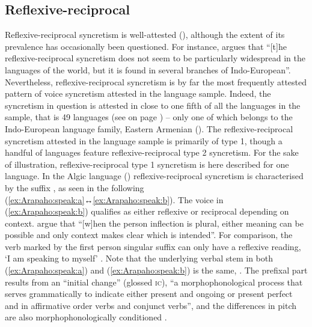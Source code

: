 \subsection{Reflexive-reciprocal} \label{sec:simple-syncretism:refl-recp}
Reflexive-reciprocal syncretism is well-attested (\citealt{geniusiene:1987, knjazev:1998, nedjalkov:2007a}), although the extent of its prevalence has occasionally been questioned. For instance, \cite[66]{creissels:2016} argues that “[t]he re\-flex\-ive-reciprocal syncretism does not seem to be particularly widespread in the languages of the world, but it is found in several branches of Indo-European”. Nevertheless, re\-flex\-ive-reciprocal syncretism is by far the most frequently attested pattern of voice syncretism attested in the language sample. Indeed, the syncretism in question is attested in close to one fifth of all the languages in the sample, that is 49 languages (see  on page \pageref{tab:ch6:voice-syncretism-simplex}) -- only one of which belongs to the Indo-European language family, Eastern Armenian (). The reflexive-reciprocal syncretism attested in the language sample is primarily of type 1, though a handful of languages feature reflexive-reciprocal type 2 syncretism. For the sake of illustration, reflexive-reciprocal type 1 syncretism is here described for one language. In the Algic language  () reflexive-reciprocal syncretism is characterised by the suffix , as seen in the following  (\ref{ex:Arapaho:speak:a}↔\ref{ex:Arapaho:speak:b}). The voice in (\ref{ex:Arapaho:speak:b}) qualifies as either reflexive or reciprocal depending on context. \cite[140]{cowell:moss:2008} argue that “[w]hen the person inflection is plural, either meaning can be possible and only context makes clear which is intended”. For comparison, the verb  marked by the first person singular suffix  can only have a reflexive reading, ‘I am speaking to myself’ \citep[139]{cowell:moss:2008}. Note that the underlying verbal stem in both (\ref{ex:Arapaho:speak:a}) and (\ref{ex:Arapaho:speak:b}) is the same, . The prefixal part  results from an “initial change” (glossed \textsc{ic}), “a morphophonological process that serves grammatically to indicate either present  and ongoing  or present perfect  and  in affirmative order verbs and conjunct  verbs”, and the differences in pitch are also morphophonologically conditioned \citep[22ff., 73]{cowell:moss:2008}.


